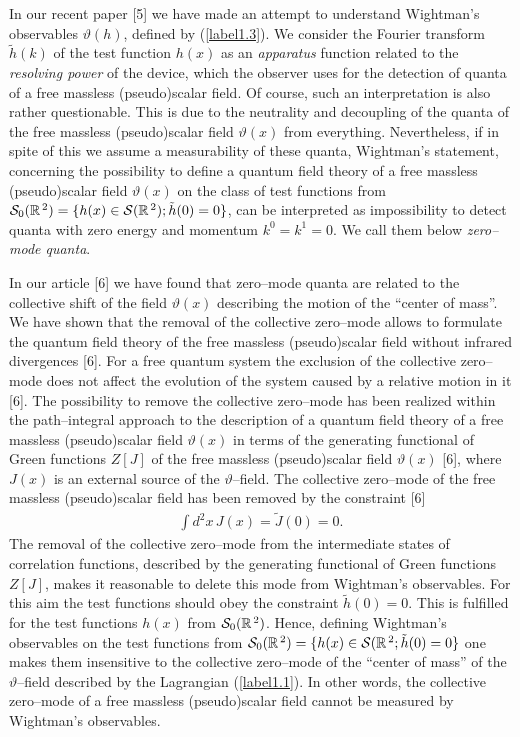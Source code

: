 \documentclass[a4paper,12pt] {article}
\begin{document}
In our recent paper [5] we have made an attempt to understand
Wightman's observables $\vartheta(h)$, defined by (\ref{label1.3}). We
consider the Fourier transform $\tilde{h}(k)$ of the test function
$h(x)$ as an {\it apparatus} function related to the {\it resolving
power} of the device, which the observer uses for the detection of
quanta of a free massless (pseudo)scalar field. Of course, such an
interpretation is also rather questionable. This is due to the
neutrality and decoupling of the quanta of the free massless
(pseudo)scalar field $\vartheta(x)$ from everything. Nevertheless, if
in spite of this we assume a measurability of these quanta, Wightman's
statement, concerning the possibility to define a quantum field theory
of a free massless (pseudo)scalar field $\vartheta(x)$ on the class of
test functions from ${\cal S}_0(\mathbb{R}^{\,2}) = \{h(x) \in {\cal
S}(\mathbb{R}^{\,2}); \tilde{h}(0) = 0\}$, can be interpreted as
impossibility to detect quanta with zero energy and momentum $k^0 =
k^1 = 0$. We call them below {\it zero--mode quanta}.

In our article [6] we have found that zero--mode quanta are related to
the collective shift of the field $\vartheta(x)$ describing the motion
of the ``center of mass''. We have shown that the removal of the
collective zero--mode allows to formulate the quantum field theory of
the free massless (pseudo)scalar field without infrared divergences
[6]. For a free quantum system the exclusion of the collective
zero--mode does not affect the evolution of the system caused by a
relative motion in it [6]. The possibility to remove the collective
zero--mode has been realized within the path--integral approach to the
description of a quantum field theory of a free massless
(pseudo)scalar field $\vartheta(x)$ in terms of the generating
functional of Green functions $Z[J]$ of the free massless
(pseudo)scalar field $\vartheta(x)$ [6], where $J(x)$ is an external
source of the $\vartheta$--field. The collective zero--mode of the
free massless (pseudo)scalar field has been removed by the constraint
[6]
%
\begin{eqnarray}\label{label1.14}
\int d^2x\,J(x) = \tilde{J}(0) = 0.
\end{eqnarray}
%
The removal of the collective zero--mode from the intermediate states
of correlation functions, described by the generating functional of
Green functions $Z[J]$, makes it reasonable to delete this mode from
Wightman's observables. For this aim the test functions should obey
the constraint $\tilde{h}(0) = 0$. This is fulfilled for the test
functions $h(x)$ from ${\cal S}_0(\mathbb{R}^{\,2})$. Hence, defining
Wightman's observables on the test functions from ${\cal
S}_0(\mathbb{R}^{\,2}) = \{h(x) \in {\cal S}(\mathbb{R}^{\,2};
\tilde{h}(0) = 0\}$ one makes them insensitive to the collective
zero--mode of the ``center of mass'' of the $\vartheta$--field
described by the Lagrangian (\ref{label1.1}). In other words, the
collective zero--mode of a free massless (pseudo)scalar field cannot
be measured by Wightman's observables.
\end{document}
